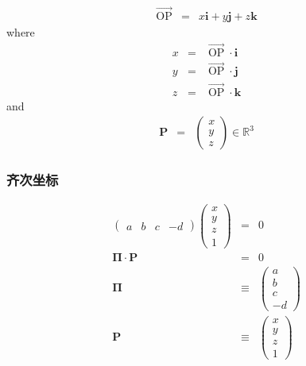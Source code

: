 \documentclass{beamer}
\newcommand{\cdummy}{\cdot}
\newcommand{\tmmathbf}[1]{\ensuremath{\boldsymbol{#1}}}
\newcommand{\tmop}[1]{\ensuremath{\operatorname{#1}}}
\begin{document}
{{\begin{frame}
\end{frame}}{\begin{frame}
  \frametitle{}
  \begin{eqnarray*}
    \overrightarrow{\tmop{OP}} & = & x\tmmathbf{i}+ y\tmmathbf{j}+
    z\tmmathbf{k}
  \end{eqnarray*}
  where
  \begin{eqnarray*}
    x & = & \overrightarrow{\tmop{OP}} \cdummy \tmmathbf{i}\\
    y & = & \overrightarrow{\tmop{OP}} \cdummy \tmmathbf{j}\\
    z & = & \overrightarrow{\tmop{OP}} \cdummy \tmmathbf{k}
  \end{eqnarray*}
  and
  \begin{eqnarray*}
    \tmmathbf{P} & = & \left(\begin{array}{c}
      x\\
      y\\
      z
    \end{array}\right) \in \mathbb{R}^3
  \end{eqnarray*}
\end{frame}}{\begin{frame}
  \frametitle{齐次坐标}
  \begin{eqnarray*}
    \left(\begin{array}{cccc}
      a & b & c & - d
    \end{array}\right) \left(\begin{array}{c}
      x\\
      y\\
      z\\
      1
    \end{array}\right) & = & 0\\
    \tmmathbf{\Pi} \cdummy \tmmathbf{P} & = & 0\\
    \tmmathbf{\Pi} & \equiv & \left(\begin{array}{c}
      a\\
      b\\
      c\\
      - d
    \end{array}\right)\\
    \tmmathbf{P} & \equiv & \left(\begin{array}{c}
      x\\
      y\\
      z\\
      1
    \end{array}\right)
  \end{eqnarray*}
  

\end{frame}}}
\end{document}
